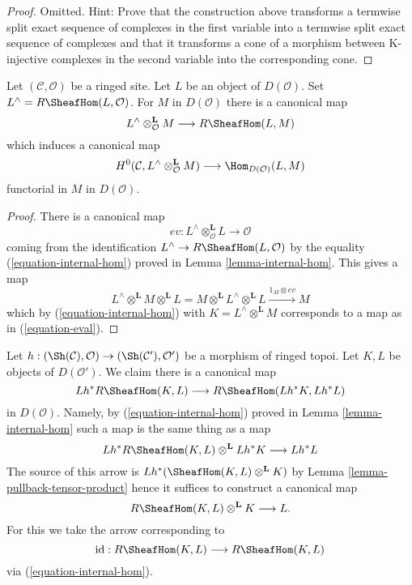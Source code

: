 \begin{proof}
Omitted. Hint: Prove that the construction above transforms a termwise
split exact sequence of complexes in the first variable into a termwise
split exact sequence of complexes and that it transforms a cone of a
morphism between K-injective complexes in the second variable into the
corresponding cone.
\end{proof}

\begin{lemma}
\label{lemma-dual}
Let $(\mathcal{C}, \mathcal{O})$ be a ringed site. Let $L$ be an
object of $D(\mathcal{O})$. Set $L^\wedge = R\SheafHom(L, \mathcal{O})$.
For $M$ in $D(\mathcal{O})$ there is a canonical map
\begin{equation}
\label{equation-eval}
L^\wedge \otimes^\mathbf{L}_\mathcal{O} M \longrightarrow R\SheafHom(L, M)
\end{equation}
which induces a canonical map
$$
H^0(\mathcal{C}, L^\wedge \otimes_\mathcal{O}^\mathbf{L} M)
\longrightarrow
\Hom_{D(\mathcal{O})}(L, M)
$$
functorial in $M$ in $D(\mathcal{O})$.
\end{lemma}

\begin{proof}
There is a canonical map
$$
ev : L^\wedge \otimes^\mathbf{L}_\mathcal{O} L \longrightarrow \mathcal{O}
$$
coming from the identification $L^\wedge \to R\SheafHom(L, \mathcal{O})$
by the equality (\ref{equation-internal-hom}) proved in
Lemma \ref{lemma-internal-hom}. This gives a map
$$
L^\wedge \otimes^\mathbf{L} M \otimes^\mathbf{L} L =
M \otimes^\mathbf{L} L^\wedge \otimes^\mathbf{L} L
\xrightarrow{1_M \otimes ev}
M
$$
which by (\ref{equation-internal-hom}) with $K = L^\wedge \otimes^\mathbf{L} M$
corresponds to a map as in (\ref{equation-eval}).
\end{proof}

\begin{remark}
\label{remark-prepare-fancy-base-change}
Let $h : (\Sh(\mathcal{C}), \mathcal{O}) \to (\Sh(\mathcal{C}'), \mathcal{O}')$
be a morphism of ringed topoi. Let $K, L$ be objects of $D(\mathcal{O}')$.
We claim there is a canonical map
$$
Lh^*R\SheafHom(K, L) \longrightarrow R\SheafHom(Lh^*K, Lh^*L)
$$
in $D(\mathcal{O})$. Namely, by (\ref{equation-internal-hom})
proved in Lemma \ref{lemma-internal-hom}
such a map is the same thing as a map
$$
Lh^*R\SheafHom(K, L) \otimes^\mathbf{L} Lh^*K \longrightarrow Lh^*L
$$
The source of this arrow is $Lh^*(\SheafHom(K, L) \otimes^\mathbf{L} K)$
by Lemma \ref{lemma-pullback-tensor-product}
hence it suffices to construct a canonical map
$$
R\SheafHom(K, L) \otimes^\mathbf{L} K \longrightarrow L.
$$
For this we take the arrow corresponding to
$$
\text{id} :
R\SheafHom(K, L)
\longrightarrow
R\SheafHom(K, L)
$$
via (\ref{equation-internal-hom}).
\end{remark}

